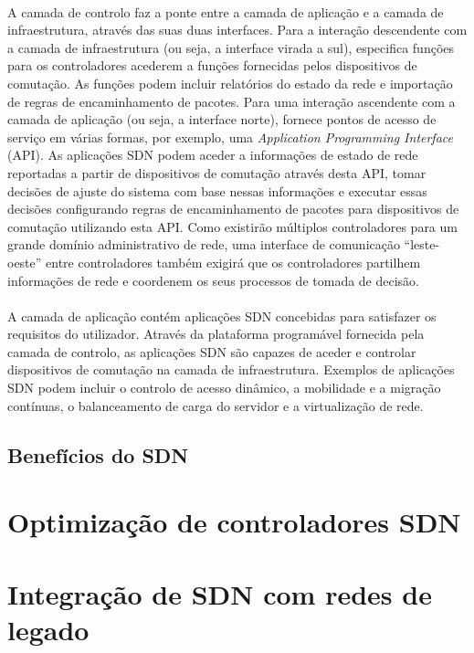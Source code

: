 \documentclass{llncs}
\begin{document}
\paragraph{}
A camada de controlo faz a ponte entre a camada de aplicação e a camada de infraestrutura, através das suas duas interfaces. Para a interação descendente com a camada de infraestrutura (ou seja, a interface virada a sul), especifica funções para os controladores acederem a funções fornecidas pelos dispositivos de comutação. As funções podem incluir relatórios do estado da rede e importação de regras de encaminhamento de pacotes. Para uma interação ascendente com a camada de aplicação (ou seja, a interface norte), fornece pontos de acesso de serviço em várias formas, por exemplo, uma \textit{Application Programming Interface} (API). As aplicações SDN podem aceder a informações de estado de rede reportadas a partir de dispositivos de comutação através desta API, tomar decisões de ajuste do sistema com base nessas informações e executar essas decisões configurando regras de encaminhamento de pacotes para dispositivos de comutação utilizando esta API. Como existirão múltiplos controladores para um grande domínio administrativo de rede, uma interface de comunicação “leste-oeste” entre controladores também exigirá que os controladores partilhem informações de rede e coordenem os seus processos de tomada de decisão.
\paragraph{}
A camada de aplicação contém aplicações SDN concebidas para satisfazer os requisitos do utilizador. Através da plataforma programável fornecida pela camada de controlo, as aplicações SDN são capazes de aceder e controlar dispositivos de comutação na camada de infraestrutura. Exemplos de aplicações SDN podem incluir o controlo de acesso dinâmico, a mobilidade e a migração contínuas, o balanceamento de carga do servidor e a virtualização de rede.

\subsection{Benefícios do SDN}

\section{Optimização de controladores SDN}

\section{Integração de SDN com redes de legado}
\end{document}
